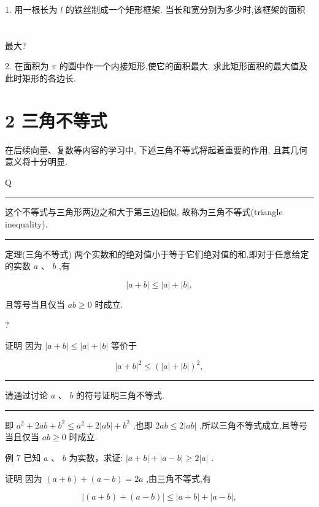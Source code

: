 \documentclass[10pt]{article}
\newcommand{\HRule}{\begin{center}\rule{0.9\linewidth}{0.2mm}\end{center}}
\begin{document}
1. 用一根长为 \(l\) 的铁丝制成一个矩形框架. 当长和宽分别为多少时,该框架的面积



\section*{}

最大?

2. 在面积为 \(\pi\) 的圆中作一个内接矩形,使它的面积最大. 求此矩形面积的最大值及此时矩形的各边长.

\section*{2 三角不等式}

在后续向量、复数等内容的学习中, 下述三角不等式将起着重要的作用, 且其几何意义将十分明显.

Q

\HRule

这个不等式与三角形两边之和大于第三边相似, 故称为三角不等式(triangle inequality).

\HRule

定理(三角不等式) 两个实数和的绝对值小于等于它们绝对值的和,即对于任意给定的实数 \(a\text{ 、 }b\) ,有

\[
\left| {a + b}\right|  \leq  \left| a\right|  + \left| b\right| ,
\]

且等号当且仅当 \({ab} \geq  0\) 时成立.

?

证明 因为 \(\left| {a + b}\right|  \leq  \left| a\right|  + \left| b\right|\) 等价于

\[
{\left| a + b\right| }^{2} \leq  {\left( \left| a\right|  + \left| b\right| \right) }^{2},
\]

\HRule

请通过讨论 \(a\text{ 、 }b\) 的符号证明三角不等式.

\HRule

即 \({a}^{2} + {2ab} + {b}^{2} \leq  {a}^{2} + 2\left| {ab}\right|  + {b}^{2}\) ,也即 \({2ab} \leq  2\left| {ab}\right|\) ,所以三角不等式成立,且等号当且仅当 \({ab} \geq  0\) 时成立.

例 7 已知 \(a\text{ 、 }b\) 为实数，求证: \(\left| {a + b}\right|  + \left| {a - b}\right|  \geq  2\left| a\right|\) .

证明 因为 \(\left( {a + b}\right)  + \left( {a - b}\right)  = {2a}\) ,由三角不等式,有

\[
\left| {\left( {a + b}\right)  + \left( {a - b}\right) }\right|  \leq  \left| {a + b}\right|  + \left| {a - b}\right| ,
\]
\end{document}
